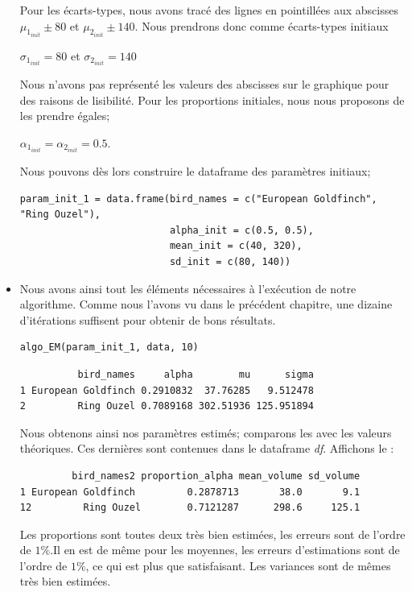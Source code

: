 \documentclass[frenchb]{report}
\newcommand{\1}{\mathbbm{1}}
\theoremstyle{definition}\newtheorem{defn}{Définition}
\theoremstyle{definition}\newtheorem{exm}{Exemple}
\theoremstyle{definition}\newtheorem{nota}{Notation}
\theoremstyle{definition}\newtheorem{rem}{Remarque}
\begin{document}
\begin{itemize}[label=\adfflowerleft]
Pour les écarts-types, nous avons tracé des lignes en pointillées aux abscisses $\mu_{1_{init}} \pm 80$ et $\mu_{2_{init}} \pm 140$. Nous prendrons donc comme écarts-types initiaux 
\begin{center}
$\sigma_{1_{init}} =  80$ et $\sigma_{2_{init}} = 140$
\end{center}
Nous n'avons pas représenté les valeurs des abscisses sur le graphique pour des raisons de lisibilité.\newline
Pour les proportions initiales, nous nous proposons de les prendre égales;  
\begin{center}
$\alpha_{1_{init}}=\alpha_{2_{init}}=0.5$.
\end{center}
Nous pouvons dès lors construire le dataframe des paramètres initiaux;

\begin{lstlisting}
param_init_1 = data.frame(bird_names = c("European Goldfinch", "Ring Ouzel"),
                          alpha_init = c(0.5, 0.5),
                          mean_init = c(40, 320),
                          sd_init = c(80, 140))

\end{lstlisting}

\item Nous avons ainsi tout les éléments nécessaires à l'exécution de notre algorithme. Comme nous l'avons vu dans le précédent chapitre, une dizaine d'itérations suffisent pour obtenir de bons résultats.

\begin{lstlisting}
algo_EM(param_init_1, data, 10)
\end{lstlisting}

\begin{verbatim}
          bird_names     alpha        mu      sigma
1 European Goldfinch 0.2910832  37.76285   9.512478
2         Ring Ouzel 0.7089168 302.51936 125.951894
\end{verbatim}
Nous obtenons ainsi nos paramètres estimés; comparons les avec les valeurs théoriques. Ces dernières sont contenues dans le dataframe \textit{df}. Affichons le :
\begin{verbatim}
         bird_names2 proportion_alpha mean_volume sd_volume
1 European Goldfinch         0.2878713       38.0       9.1
12         Ring Ouzel        0.7121287      298.6     125.1
\end{verbatim}

Les proportions sont toutes deux très bien estimées, les erreurs sont de l'ordre de $1\%$.Il en est de même pour les moyennes, les erreurs d'estimations sont de l'ordre de $1\%$, ce qui est plus que satisfaisant. Les variances sont de mêmes très bien estimées.



\end{itemize}
\end{document}
